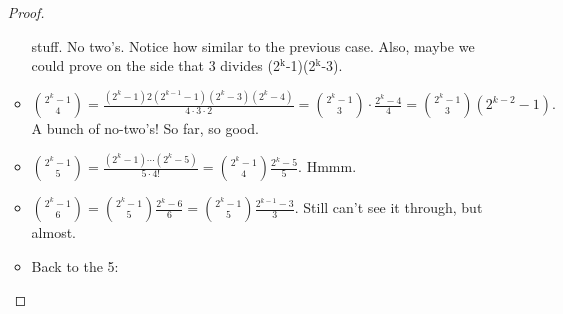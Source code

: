 \documentclass[11pt, oneside]{amsart}
\begin{document}
\begin{enumerate}
\begin{proof}
\begin{itemize}
stuff.  No two's. Notice how similar to the previous case.  Also, maybe we could prove on the side that 3 divides
(2\(^{\text{k}}\)-1)(2\(^{\text{k}}\)-3).
\item \(\binom{2^k-1}{4} = \frac{ (2^k-1)2(2^{k-1}-1)(2^k-3)(2^k-4) }{4\cdot 3\cdot 2} = \binom{2^k-1}{3} \cdot \frac{
      2^k-4 }{4} = \binom{2^k-1}{3} (2^{k-2}-1).\)  A bunch of no-two's!  So far, so good.
\item \(\binom{2^k-1}{5} = \frac{ (2^k-1)\dotsb(2^k-5) }{5\cdot 4! } = \binom{2^k-1}{4} \frac{ 2^k-5 }{5}.\)  Hmmm.
\item \(\binom{2^k-1}{6} = \binom{2^k-1}{5} \frac{ 2^k-6 }{6} = \binom{2^k-1}{5} \frac{ 2^{k-1}-3 }{3}\). Still can't
see it through, but almost.
\item Back to the 5:
\end{itemize}


\end{proof}
\end{enumerate}
\end{document}
